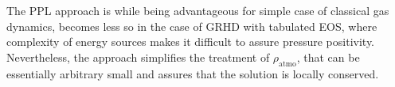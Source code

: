 The \ac{PPL} approach is while being advantageous for simple case of classical gas dynamics,
becomes less so in the case of \ac{GRHD} with tabulated \ac{EOS}, where complexity 
of energy sources makes it difficult to assure pressure positivity. 
Nevertheless, the approach simplifies the treatment of $\rho_{\text{atmo}}$, 
that can be essentially arbitrary small and assures that the solution is locally
conserved.

